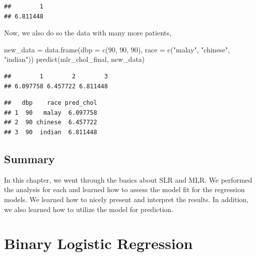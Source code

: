 \documentclass[
  10pt,
]{krantz}
\newenvironment{Shaded}{\begin{snugshade}}{\end{snugshade}}
\newcommand{\AttributeTok}[1]{\textcolor[rgb]{0.77,0.63,0.00}{#1}}
\newcommand{\DecValTok}[1]{\textcolor[rgb]{0.00,0.00,0.81}{#1}}
\newcommand{\FunctionTok}[1]{\textcolor[rgb]{0.00,0.00,0.00}{#1}}
\newcommand{\NormalTok}[1]{#1}
\newcommand{\OtherTok}[1]{\textcolor[rgb]{0.56,0.35,0.01}{#1}}
\newcommand{\SpecialCharTok}[1]{\textcolor[rgb]{0.00,0.00,0.00}{#1}}
\newcommand{\StringTok}[1]{\textcolor[rgb]{0.31,0.60,0.02}{#1}}
\begin{document}
\begin{verbatim}
##        1 
## 6.811448
\end{verbatim}

Now, we also do so the data with many more patients,

\begin{Shaded}
\begin{Highlighting}[]
\NormalTok{new\_data }\OtherTok{=} \FunctionTok{data.frame}\NormalTok{(}\AttributeTok{dbp =} \FunctionTok{c}\NormalTok{(}\DecValTok{90}\NormalTok{, }\DecValTok{90}\NormalTok{, }\DecValTok{90}\NormalTok{), }
                      \AttributeTok{race =} \FunctionTok{c}\NormalTok{(}\StringTok{"malay"}\NormalTok{, }\StringTok{"chinese"}\NormalTok{, }\StringTok{"indian"}\NormalTok{))}
\FunctionTok{predict}\NormalTok{(mlr\_chol\_final, new\_data)}
\end{Highlighting}
\end{Shaded}

\begin{verbatim}
##        1        2        3 
## 6.097758 6.457722 6.811448
\end{verbatim}

\begin{Shaded}
\end{Shaded}

\begin{verbatim}
##   dbp    race pred_chol
## 1  90   malay  6.097758
## 2  90 chinese  6.457722
## 3  90  indian  6.811448
\end{verbatim}

\hypertarget{summary-1}{%
\section{Summary}\label{summary-1}}

In this chapter, we went through the basics about SLR and MLR. We performed the analysis for each and learned how to assess the model fit for the regression models. We learned how to nicely present and interpret the results. In addition, we also learned how to utilize the model for prediction.

\hypertarget{binary-logistic-regression}{%
\chapter{\texorpdfstring{Binary Logistic Regression}{Binary Logistic Regression}}\label{binary-logistic-regression}}
\end{document}
